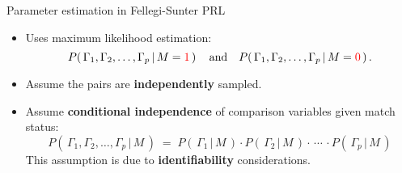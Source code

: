 
\begin{frame}{\Large Parameter estimation in Fellegi-Sunter PRL}

\Large

\begin{itemize}
\pause\item
	Uses maximum likelihood estimation:
	{\small
	\begin{equation*}
	P\!\left(\,\Gamma_{1},\Gamma_{2},\ldots,\Gamma_{p}\,\vert\,M={\color{red}1}\,\right)
	\quad\textnormal{and}\quad
	P\!\left(\,\Gamma_{1},\Gamma_{2},\ldots,\Gamma_{p}\,\vert\,M={\color{red}0}\,\right).
	\end{equation*}
	}
\pause\item
	\vskip -0.4cm
	Assume the pairs are \textbf{independently} sampled.
	\vskip 0.8cm
\pause\item
	Assume \textbf{conditional independence} of comparison variables given match status:
	{\small
	\begin{equation*}
	P\!\left(\,\Gamma_{1},\Gamma_{2},\ldots,\Gamma_{p}\,\vert\,M\,\right)
	\;=\;
	P\!\left(\,\Gamma_{1}\,\vert\,M\,\right)
	\cdot
	P\!\left(\,\Gamma_{2}\,\vert\,M\,\right)
	\cdot \,\cdots\, \cdot
	P\!\left(\,\Gamma_{p}\,\vert\,M\,\right)
	\end{equation*}
	}
	\pause\vskip -0.6cm
	{\small This assumption is due to \textbf{\color{red}identifiability} considerations.}
\end{itemize}

\end{frame}
\normalsize

